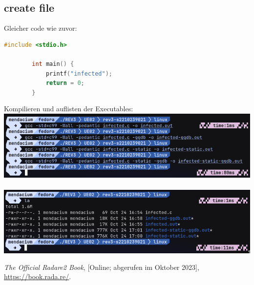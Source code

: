 \documentclass{article}
\begin{document}
	\subsection{create file}
	Gleicher code wie zuvor:\\
	\begin{lstlisting}[language=c]
		#include <stdio.h>
		
		int main() {
			printf("infected");
			return = 0;
		}
	\end{lstlisting}
	Kompilieren und auflisten der Executables:\\
	\includegraphics[width=0.7\linewidth]{pictures/2. compile files}\\
	\\
	\includegraphics[width=0.5\linewidth]{pictures/2. all files}\\
	
	\pagebreak
	
	
	\begin{thebibliography}{9}
		
		\emph{The Official Radare2 Book},
		[Online; abgerufen im Oktober 2023],
		\url{https://book.rada.re/}.
		
	\end{thebibliography}
	
	
	\label{LastPage}
	
\end{document}
